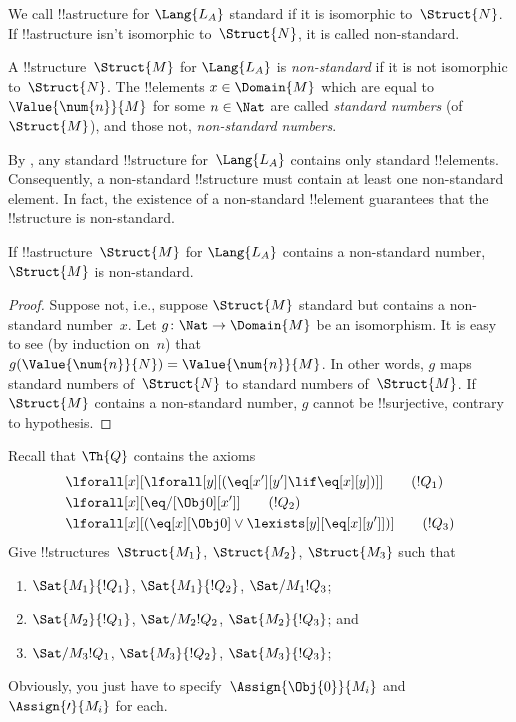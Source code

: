 \documentclass[../../../include/open-logic-section]{subfiles}
\begin{document}

\begin{explain}
We call !!a{structure} for $\Lang{L_A}$ standard if it is isomorphic
to~$\Struct{N}$. If !!a{structure} isn't isomorphic to~$\Struct{N}$,
it is called non-standard.
\end{explain}

\begin{defn}
A !!{structure}~$\Struct{M}$ for $\Lang{L_A}$ is \emph{non-standard}
if it is not isomorphic to~$\Struct{N}$. The !!{element}s $x \in
\Domain{M}$ which are equal to $\Value{\num{n}}{M}$ for some $n \in
\Nat$ are called \emph{standard numbers} (of $\Struct{M}$), and those
not, \emph{non-standard numbers}.
\end{defn}

\begin{explain}
By , any standard !!{structure}
for~$\Lang{L_A}$ contains only standard !!{element}s. Consequently, a
non-standard !!{structure} must contain at least one non-standard
element. In fact, the existence of a non-standard !!{element}
guarantees that the !!{structure} is non-standard.
\end{explain}

\begin{prop}
If !!a{structure}~$\Struct{M}$ for $\Lang{L_A}$ contains a
non-standard number, $\Struct{M}$ is non-standard.
\end{prop}

\begin{proof}
Suppose not, i.e., suppose $\Struct{M}$ standard but contains a
non-standard number~$x$. Let $g\colon \Nat \to \Domain{M}$ be an
isomorphism. It is easy to see (by induction on~$n$) that
$g(\Value{\num{n}}{N}) = \Value{\num{n}}{M}$. In other words, $g$ maps
standard numbers of~$\Struct{N}$ to standard numbers
of~$\Struct{M}$. If $\Struct{M}$ contains a non-standard number, $g$
cannot be !!{surjective}, contrary to hypothesis.
\end{proof}

\begin{prob}
Recall that $\Th{Q}$ contains the axioms
\begin{align*}
& \lforall[x][\lforall[y][(\eq[x'][y'] \lif \eq[x][y])]] \tag{$!Q_1$}\\
& \lforall[x][\eq/[\Obj 0][x']] \tag{$!Q_2$}\\
& \lforall[x][(\eq[x][\Obj 0] \lor \lexists[y][\eq[x][y']])] \tag{$!Q_3$}
\end{align*}
Give !!{structure}s~$\Struct{M_1}$, $\Struct{M_2}$, $\Struct{M_3}$ such that
\begin{enumerate}
\item $\Sat{M_1}{!Q_1}$, $\Sat{M_1}{!Q_2}$, $\Sat/{M_1}{!Q_3}$;
\item $\Sat{M_2}{!Q_1}$, $\Sat/{M_2}{!Q_2}$, $\Sat{M_2}{!Q_3}$; and
\item $\Sat/{M_3}{!Q_1}$, $\Sat{M_3}{!Q_2}$, $\Sat{M_3}{!Q_3}$;
\end{enumerate}
Obviously, you just have to specify~$\Assign{\Obj{0}}{M_i}$ and
$\Assign{\prime}{M_i}$ for each.
\end{prob}
\end{document}
